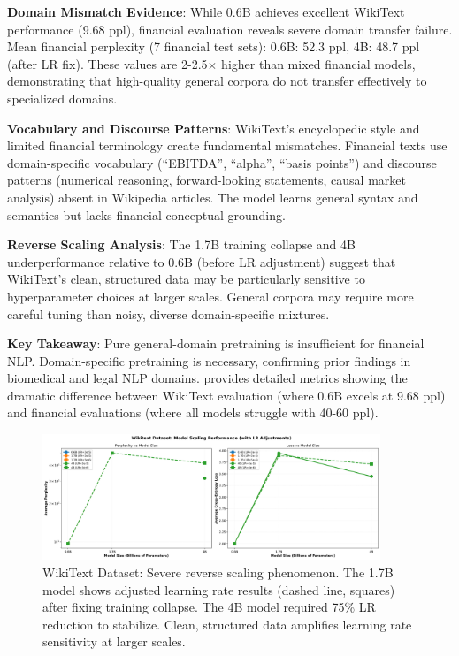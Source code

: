 \textbf{Domain Mismatch Evidence}: While 0.6B achieves excellent WikiText performance (9.68 ppl), financial evaluation reveals severe domain transfer failure. Mean financial perplexity (7 financial test sets): 0.6B: 52.3 ppl, 4B: 48.7 ppl (after LR fix). These values are 2-2.5$\times$ higher than mixed financial models, demonstrating that high-quality general corpora do not transfer effectively to specialized domains.

\textbf{Vocabulary and Discourse Patterns}: WikiText's encyclopedic style and limited financial terminology create fundamental mismatches. Financial texts use domain-specific vocabulary (``EBITDA'', ``alpha'', ``basis points'') and discourse patterns (numerical reasoning, forward-looking statements, causal market analysis) absent in Wikipedia articles. The model learns general syntax and semantics but lacks financial conceptual grounding.

\textbf{Reverse Scaling Analysis}: The 1.7B training collapse and 4B underperformance relative to 0.6B (before LR adjustment) suggest that WikiText's clean, structured data may be particularly sensitive to hyperparameter choices at larger scales. General corpora may require more careful tuning than noisy, diverse domain-specific mixtures.

\textbf{Key Takeaway}: Pure general-domain pretraining is insufficient for financial NLP. Domain-specific pretraining is necessary, confirming prior findings in biomedical and legal NLP domains.  provides detailed metrics showing the dramatic difference between WikiText evaluation (where 0.6B excels at 9.68 ppl) and financial evaluations (where all models struggle with 40-60 ppl).

\begin{figure}[h]
\centering
\includegraphics[width=0.9\textwidth]{figures/scaling_wikitext.png}
\caption[WikiText Dataset: Reverse Scaling]{WikiText Dataset: Severe reverse scaling phenomenon. The 1.7B model shows adjusted learning rate results (dashed line, squares) after fixing training collapse. The 4B model required 75\% LR reduction to stabilize. Clean, structured data amplifies learning rate sensitivity at larger scales.}
\label{fig:scaling_wikitext}
\end{figure}

